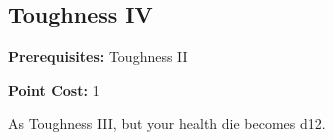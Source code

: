 \subsection{Toughness IV}\label{feat:toughness4}

\noindent
\textbf{Prerequisites:} Toughness II

\noindent
\textbf{Point Cost:} 1 

As Toughness III, but your health die becomes d12.
